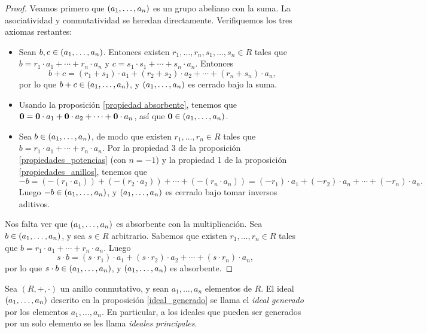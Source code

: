 \begin{proof}
Veamos primero que $\left( a_1, \dots, a_n \right)$ es un grupo abeliano con la suma. La asociatividad y conmutatividad se heredan directamente. Verifiquemos los tres axiomas restantes:
\begin{itemize}
\item Sean $b, c \in \left( a_1, \dots, a_n \right)$. Entonces existen $r_1, \dots, r_n, s_1, \dots, s_n \in R$ tales que $b = r_1 \cdot a_1 + \cdots + r_n \cdot a_n$ y $c = s_1 \cdot s_1 + \cdots + s_n \cdot a_n$. Entonces
$$b + c = (r_1 + s_1) \cdot a_1 + (r_2 + s_2) \cdot a_2 + \cdots + (r_n + s_n) \cdot a_n,$$
por lo que $b + c \in \left( a_1, \dots, a_n \right)$, y $\left( a_1, \dots, a_n \right)$ es cerrado bajo la suma.
\item Usando la proposición \ref{propiedad absorbente}, tenemos que $\mathbf{0} = \mathbf{0} \cdot a_1 + \mathbf{0} \cdot a_2 + \cdots + \mathbf{0} \cdot a_n$, así que $\mathbf{0} \in \left( a_1, \dots, a_n \right)$.
\item Sea $b \in \left( a_1, \dots, a_n \right)$, de modo que existen $r_1, \dots, r_n \in R$ tales que $b = r_1 \cdot a_1 + \cdots + r_n \cdot a_n$. Por la propiedad 3 de la proposición \ref{propiedades_potencias} (con $n=-1$) y la propiedad 1 de la proposición \ref{propiedades_anillos}, tenemos que $$-b = ( - (r_1 \cdot a_1)) + ( - (r_2 \cdot a_2)) + \cdots + ( - (r_n \cdot a_n))= (-r_1) \cdot a_1 + (-r_2) \cdot a_n + \cdots + (-r_n) \cdot a_n.$$ Luego $-b \in \left( a_1, \dots, a_n \right)$, y $\left( a_1, \dots, a_n \right)$ es cerrado bajo tomar inversos aditivos.
\end{itemize} 
Nos falta ver que $\left( a_1, \dots, a_n \right)$ es absorbente con la multiplicación. Sea $b \in \left( a_1, \dots, a_n \right)$, y sea $s \in R$ arbitrario. Sabemos que existen $r_1, \dots, r_n \in R$ tales que $b = r_1 \cdot a_1 + \cdots + r_n \cdot a_n$. Luego
$$s \cdot b = (s \cdot r_1) \cdot a_1 + (s \cdot r_2) \cdot a_2 + \cdots + (s \cdot r_n) \cdot a_n,$$
por lo que $s \cdot b \in \left( a_1, \dots, a_n \right)$, y $\left( a_1, \dots, a_n \right)$ es absorbente. 
\end{proof}

\begin{definition}
Sea $(R, +, \cdot)$ un anillo conmutativo, y sean $a_1, \dots, a_n$ elementos de $R$. El ideal $\left( a_1, \dots, a_n \right)$ descrito en la proposición \ref{ideal_generado} se llama el \emph{ideal generado} por los elementos $a_1, \dots, a_n$. En particular, a los ideales que pueden ser generados por un solo elemento se les llama \emph{ideales principales}.
\end{definition}

